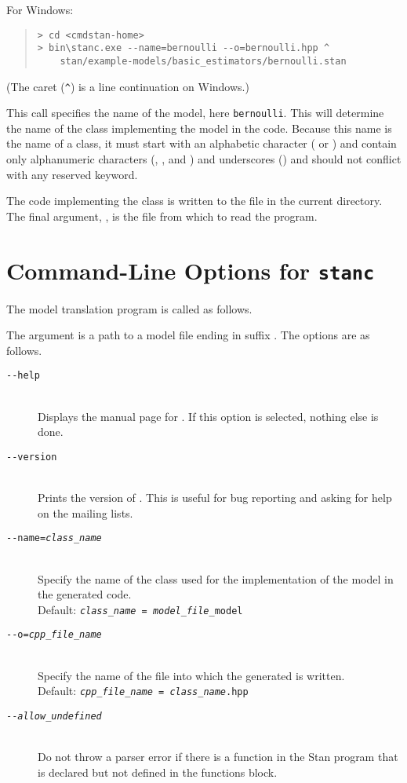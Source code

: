 For Windows:
%
\begin{quote}
\begin{Verbatim}[fontshape=sl]
> cd <cmdstan-home>
> bin\stanc.exe --name=bernoulli --o=bernoulli.hpp ^
    stan/example-models/basic_estimators/bernoulli.stan 
\end{Verbatim}
\end{quote}
%
(The caret (\Verb|^|) is a line continuation on Windows.)

This call specifies the name of the model, here {\tt bernoulli}.
This will determine the name of the class implementing the model in
the \Cpp code.  Because this name is the name of a \Cpp class, it must
start with an alphabetic character ( or ) and
contain only alphanumeric characters (, , and
) and underscores (\code{\_}) and should not conflict with
any \Cpp reserved keyword.  

The \Cpp code implementing the class is written to the file
 in the current directory.  The final argument,
, is the file from which to read the \Stan
program.

\section{Command-Line Options for {\tt\bfseries stanc}}

The model translation program  is called as follows.
%
\begin{quote}
\end{quote}
%
The argument  is a path to a \Stan model
file ending in suffix .  The options are as follows.
%
\begin{description}
%
\item[\tt {-}-help] 
\mbox{ } \\ 
Displays the manual page for \stanc.  If this option is selected,
nothing else is done.
%
\item[\tt {-}-version]
\mbox{ } \\ 
Prints the version of \stanc.  This is useful for bug reporting
and asking for help on the mailing lists.
%
\item[\tt {-}-name={\slshape class\_name}]
\mbox{ } \\ 
Specify the name of the class used for the implementation of the
\Stan model in the generated \Cpp code.  
\\[2pt]
Default: {\tt {\slshape class\_name = model\_file}\_model}
%
\item[\tt {-}-o={\slshape cpp\_file\_name}]
\mbox{ } \\ 
Specify the name of the file into which the generated \Cpp is written.
\\[2pt]
Default: {\tt {\slshape cpp\_file\_name} = {\slshape class\_name}.hpp}
%
\item[\tt {-}-{\slshape allow\_undefined}]
\mbox{ } \\ 
Do not throw a parser error if there is a function in the Stan program
that is declared but not defined in the functions block.
%
\end{description}

